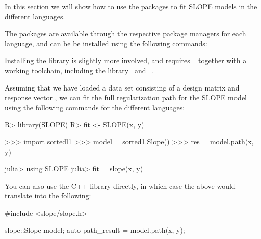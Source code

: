 \documentclass[article]{jss}
\begin{document}
In this section we will show how to use the packages to fit SLOPE models in
the different languages.

The packages are
available through the respective package managers for each language, and can be
be installed using the following commands:

\begin{description}[labelwidth=8ex]
  \item[\proglang{R}] 
  \item[\proglang{Python}] 
  \item[\proglang{Julia}] 
\end{description}

Installing the  library is slightly more involved, and requires
~\citep{kitware2025} together with a working  toolchain, including
the  library~\citep{guennebaud2010a} and ~\citep{dagum1998}.

Assuming that we have loaded a data set consisting of a design
matrix  and response vector , we can fit the full regularization
path for the SLOPE model using the following commands for the different languages:

\begin{minipage}[t]{0.25\textwidth}%
  \begin{Code}
R> library(SLOPE)
R> fit <- SLOPE(x, y)
  \end{Code}
\end{minipage}
\hfill
\begin{minipage}[t]{0.32\textwidth}
  \begin{Code}
>>> import sortedl1
>>> model = sorted1.Slope()
>>> res = model.path(x, y)
  \end{Code}
\end{minipage}
\hfill
\begin{minipage}[t]{0.32\textwidth}
  \begin{Code}
julia> using SLOPE
julia> fit = slope(x, y)
  \end{Code}
\end{minipage}

\medskip

You can also use the C++ library directly, in
which case the above would translate into the
following:
\begin{Code}
#include <slope/slope.h>

slope::Slope model;
auto path_result = model.path(x, y);
\end{Code}
\end{document}
